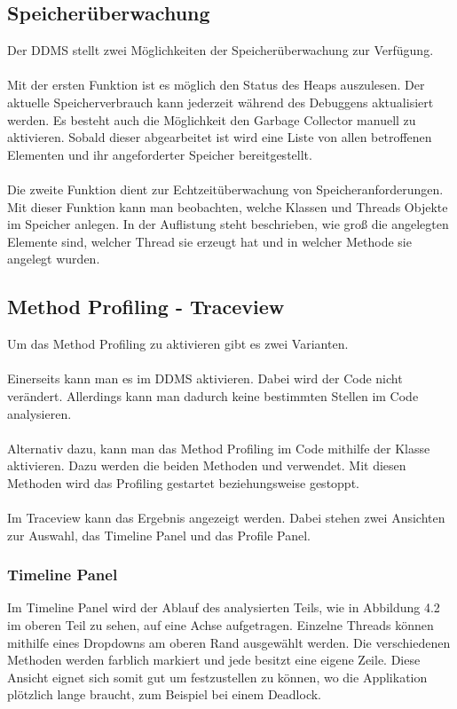 \subsection{Speicherüberwachung}
Der DDMS stellt zwei Möglichkeiten der Speicherüberwachung zur Verfügung.
\\
\\
Mit der ersten Funktion ist es möglich den Status des Heaps auszulesen. Der aktuelle Speicherverbrauch kann jederzeit während des Debuggens aktualisiert werden. Es besteht auch die Möglichkeit den Garbage Collector manuell zu aktivieren. Sobald dieser abgearbeitet ist wird eine Liste von allen betroffenen Elementen und ihr angeforderter Speicher bereitgestellt.\cite{41}
\\
\\
Die zweite Funktion dient zur Echtzeitüberwachung von Speicheranforderungen. Mit dieser Funktion kann man beobachten, welche Klassen und Threads Objekte im Speicher anlegen. In der Auflistung steht beschrieben, wie groß die angelegten Elemente sind, welcher Thread sie erzeugt hat und in welcher Methode sie angelegt wurden.\cite{41}

\subsection{Method Profiling - Traceview}
Um das Method Profiling zu aktivieren gibt es zwei Varianten.
\\
\\
Einerseits kann man es im DDMS aktivieren. Dabei wird der Code nicht verändert. Allerdings kann man dadurch keine bestimmten Stellen im Code analysieren.\cite{41}
\\
\\
Alternativ dazu, kann man das Method Profiling im Code mithilfe der  Klasse aktivieren. Dazu werden die beiden Methoden  und  verwendet. Mit diesen Methoden wird das Profiling gestartet beziehungsweise gestoppt.\cite{42}
\\
\\
Im Traceview kann das Ergebnis angezeigt werden. Dabei stehen zwei Ansichten zur Auswahl, das Timeline Panel und das Profile Panel.

\subsubsection{Timeline Panel}
Im Timeline Panel wird der Ablauf des analysierten Teils, wie in Abbildung 4.2 im oberen Teil zu sehen, auf eine Achse aufgetragen. Einzelne Threads können mithilfe eines Dropdowns am oberen Rand ausgewählt werden. Die verschiedenen Methoden werden farblich markiert und jede besitzt eine eigene Zeile. Diese Ansicht eignet sich somit gut um festzustellen zu können, wo die Applikation plötzlich lange braucht, zum Beispiel bei einem Deadlock.\cite{42}

